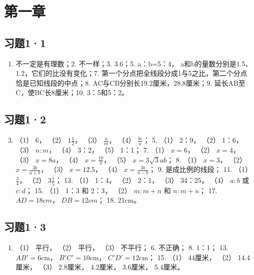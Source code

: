 \section{第一章}

\subsection{习题1·1}

\begin{enumerate}
\item
  不一定是有理数；2. 不一样；3. 3.6；5. a：b=5：4，
  a和b的量数分别是1.5、1.2，它们的比没有变化；7.
  第一个分点把全线段分成1与5之比，第二个分点恰是已知线段的中点；8.
  AC与CB分别长19.2厘米，28.8厘米；9. 延长AB至C，使BC长8厘米；10.
  3：5和5：2。
\end{enumerate}

\subsection{习题1·2}

\begin{enumerate}
\setcounter{enumi}{2}
\item
  （1） 6， （2） \(1\frac{1}{2}\)， （3） \(\frac{n}{m}\)， （4）
  \(\frac{bc}{a}\)； 5. （1） 2：9， （2） 1：6， （3） \(n:m\)， （4）
  3：2， （5） 1：1； 7. （1） \(x=6\)， （2） \(x=4\)， （3）
  \(x=8a\)， （4） \(x=\frac{10}{3}\)， （5） \(x=3\sqrt{3}ab\)； 8.
  （1） \(x=3\)， （2） \(x=\frac{3b}{a+b}\)， （3） \(x=12.5\)， （4）
  \(x=\frac{3b}{a-b}\)； 9. 是成比例的线段； 11. （1） \(\frac{3}{4}\)，
  （2） \(3\frac{1}{5}\)； 13. （1） 1：4， （2） 2：1， （3） 34：25，
  （4） \(a:b\) 或 \(c:d\)； 15. （1） 1：3 和 2：3， （2） \(m:m+n\) 和
  \(n:m+n\)； 17. \(AD=18cm\)， \(DB=12cm\)； 18. 21cm。
\end{enumerate}

\subsection{习题1·3}

\begin{enumerate}
\item
  （1） 平行， （2） 平行， （3） 不平行； 6. 不正确； 8. 1：1； 13.
  \(AB' = 6\mathrm{cm}\)， \(B'C' = 10\mathrm{cm}\)，
  \(C'D' = 12\mathrm{cm}\)； 15. （1） 44厘米， （2） 14.4厘米， （3）
  2.8厘米， 4.2厘米， 3.6厘米， 5.4厘米。
\end{enumerate}

